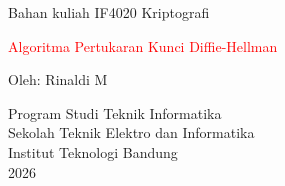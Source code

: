 \documentclass{article}
\begin{document}

\begin{center}
Bahan kuliah IF4020 Kriptografi

{\huge \textcolor{red}{Algoritma Pertukaran Kunci Diffie-Hellman}}

\vspace{20mm}

Oleh: Rinaldi M

\vspace{10mm}

Program Studi Teknik Informatika\\
Sekolah Teknik Elektro dan Informatika\\
Institut Teknologi Bandung\\
2026
\end{center}
\end{document}
